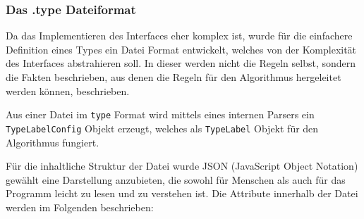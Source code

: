 \subsubsection{Das .type Dateiformat}

Da das Implementieren des Interfaces eher komplex ist, wurde für die einfachere 
Definition eines Types ein Datei Format entwickelt, welches von der Komplexität des
Interfaces abstrahieren soll. In dieser werden nicht die Regeln selbst, sondern 
die Fakten beschrieben, aus denen die Regeln für den Algorithmus hergeleitet werden 
können, beschrieben.

Aus einer Datei im \texttt{type} Format wird mittels eines internen Parsers ein
\texttt{TypeLabelConfig} Objekt erzeugt, welches als \texttt{TypeLabel} Objekt für
den Algorithmus fungiert.

Für die inhaltliche Struktur der Datei wurde JSON (JavaScript Object Notation) 
gewählt eine Darstellung anzubieten, die sowohl für Menschen als auch für das 
Programm leicht zu lesen und zu verstehen ist. Die Attribute innerhalb der Datei 
werden im Folgenden beschrieben:

